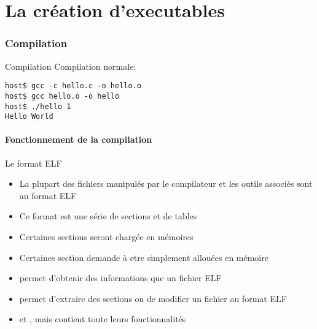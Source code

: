 %
%
%

\part{La création d'executables}

\begin{frame}
  \partpage
\end{frame}

\begin{frame}
  \tableofcontents
\end{frame}

\section{Compilation}

\begin{frame}[fragile=singleslide]{Compilation}
  Compilation normale:
  \begin{lstlisting}
host$ gcc -c hello.c -o hello.o
host$ gcc hello.o -o hello
host$ ./hello 1
Hello World
  \end{lstlisting} %
\end{frame}

\subsection{Fonctionnement de la compilation}

\begin{frame}[fragile=singleslide]{Le format ELF}
  \begin{itemize}
  \item La  plupart des fichiers  manipulés par le compilateur  et les
    outils associés sont au format ELF
  \item Ce format est une série de sections et de tables
  \item  Certaines sections seront chargée en mémoires
  \item  Certaines  section  demande  à etre  simplement  allouées  en
    mémoire
  \item  {} permet  d'obtenir des  informations  que un
    fichier ELF
  \item  {}  permet   d'extraire  des  sections  ou  de
    modifier un fichier au format ELF
  \item {}  et , mais   contient
    toute leurs fonctionnalités
  \end{itemize}
\end{frame}

